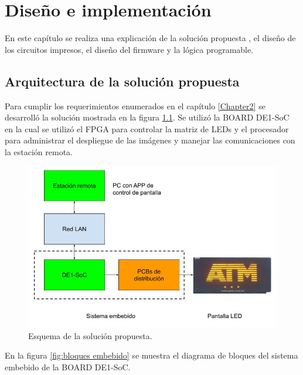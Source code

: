 \chapter{Diseño e implementación} %

\label{Chapter3} 
En este capítulo se realiza una explicación de la solución propuesta , el diseño de los circuitos impresos, el diseño del firmware y la lógica programable.

\section{ Arquitectura de la solución propuesta}
Para cumplir los requerimientos enumerados en el capítulo \ref{Chapter2} se desarrolló la solución mostrada en la figura \ref{fig:solución}. Se utilizó la BOARD DE1-SoC en la cual se utilizó el FPGA para controlar la matriz de LEDs y el procesador para administrar el despliegue de las imágenes y manejar las comunicaciones con la estación remota.
\begin{figure}[htpb]
	\centering
	\includegraphics[scale=2]{Figures/Diagramasistemavms.jpg} 
	\caption{Esquema de la solución propuesta.}
	\label{fig:solución}
\end{figure}

En la figura \ref{fig:bloques embebido} se muestra el diagrama de bloques del sistema embebido de la BOARD DE1-SoC.
 
